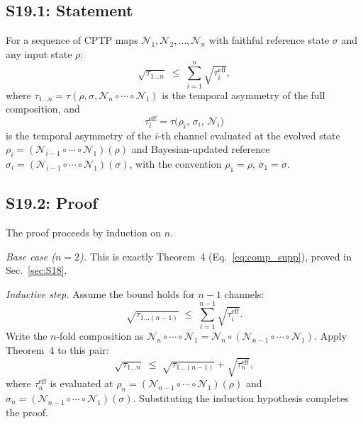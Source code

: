 \documentclass[prl,twocolumn,superscriptaddress,longbibliography]{revtex4-2}
\newcommand{\chan}{\mathcal{N}}
\newcommand{\tauasym}{\tau}
\begin{document}
\subsection{S19.1: Statement}

For a sequence of CPTP maps
$\chan_1, \chan_2, \ldots, \chan_n$ with faithful reference state
$\sigma$ and any input state $\rho$:
\begin{equation}
\sqrt{\tauasym_{1\ldots n}}
\;\leq\; \sum_{i=1}^{n} \sqrt{\tauasym_i^{\mathrm{eff}}},
\label{eq:Ncomp}
\end{equation}
where $\tauasym_{1\ldots n}
= \tauasym(\rho, \sigma, \chan_n \circ \cdots \circ \chan_1)$
is the temporal asymmetry of the full composition, and
\begin{equation}
\tauasym_i^{\mathrm{eff}}
= \tauasym\!\big(\rho_i,\, \sigma_i,\, \chan_i\big)
\label{eq:tau_eff_i}
\end{equation}
is the temporal asymmetry of the $i$-th channel evaluated at the
evolved state $\rho_i = (\chan_{i-1} \circ \cdots \circ \chan_1)(\rho)$
and Bayesian-updated reference
$\sigma_i = (\chan_{i-1} \circ \cdots \circ \chan_1)(\sigma)$,
with the convention $\rho_1 = \rho$, $\sigma_1 = \sigma$.

\subsection{S19.2: Proof}

The proof proceeds by induction on $n$.

\emph{Base case ($n = 2$).}
This is exactly Theorem~4 (Eq.~\eqref{eq:comp_supp}), proved in
Sec.~\ref{sec:S18}.

\emph{Inductive step.}
Assume the bound holds for $n-1$ channels:
\begin{equation}
\sqrt{\tauasym_{1\ldots(n-1)}}
\;\leq\; \sum_{i=1}^{n-1} \sqrt{\tauasym_i^{\mathrm{eff}}}.
\end{equation}
Write the $n$-fold composition as
$\chan_n \circ \cdots \circ \chan_1
= \chan_n \circ (\chan_{n-1} \circ \cdots \circ \chan_1)$.
Apply Theorem~4 to this pair:
\begin{equation}
\sqrt{\tauasym_{1\ldots n}}
\;\leq\; \sqrt{\tauasym_{1\ldots(n-1)}}
+ \sqrt{\tauasym_n^{\mathrm{eff}}},
\end{equation}
where $\tauasym_n^{\mathrm{eff}}$ is evaluated at
$\rho_n = (\chan_{n-1} \circ \cdots \circ \chan_1)(\rho)$ and
$\sigma_n = (\chan_{n-1} \circ \cdots \circ \chan_1)(\sigma)$.
Substituting the induction hypothesis completes the proof.
\end{document}
